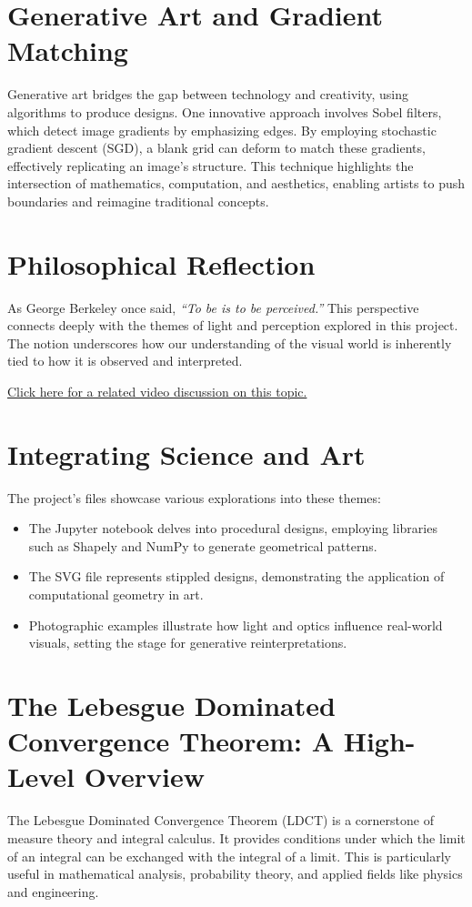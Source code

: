 \section*{Generative Art and Gradient Matching}
Generative art bridges the gap between technology and creativity, using algorithms to produce designs. One innovative approach involves Sobel filters, which detect image gradients by emphasizing edges. By employing stochastic gradient descent (SGD), a blank grid can deform to match these gradients, effectively replicating an image's structure. This technique highlights the intersection of mathematics, computation, and aesthetics, enabling artists to push boundaries and reimagine traditional concepts.

\section*{Philosophical Reflection}
As George Berkeley once said, \emph{\textquotedblleft To be is to be perceived.\textquotedblright} This perspective connects deeply with the themes of light and perception explored in this project. The notion underscores how our understanding of the visual world is inherently tied to how it is observed and interpreted.

\href{https://www.youtube.com/watch?v=idl8TvI-0iw}{Click here for a related video discussion on this topic.}

\section*{Integrating Science and Art}
The project's files showcase various explorations into these themes:

\begin{itemize}
    \item The Jupyter notebook delves into procedural designs, employing libraries such as Shapely and NumPy to generate geometrical patterns.
    \item The SVG file represents stippled designs, demonstrating the application of computational geometry in art.
    \item Photographic examples illustrate how light and optics influence real-world visuals, setting the stage for generative reinterpretations.
\end{itemize}

\section*{The Lebesgue Dominated Convergence Theorem: A High-Level Overview}
The Lebesgue Dominated Convergence Theorem (LDCT) is a cornerstone of measure theory and integral calculus. It provides conditions under which the limit of an integral can be exchanged with the integral of a limit. This is particularly useful in mathematical analysis, probability theory, and applied fields like physics and engineering.

